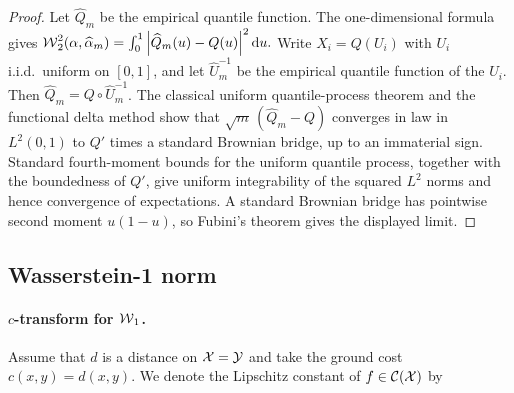 \begin{proof}
Let $\widehat Q_m$ be the empirical quantile function. The one-dimensional formula gives \(\operatorname{\mathcal{W}}_2^2(\alpha,\widehat{\alpha}_m) = \int_0^1\left\lvert\widehat Q_m(u)-Q(u)\right\rvert^2\mathrm{d} u.\)
Write $X_i=Q(U_i)$ with $U_i$ i.i.d.\ uniform on $[0,1]$, and let $\widehat U_m^{-1}$ be the empirical quantile function of the $U_i$. Then $\widehat Q_m=Q\circ \widehat U_m^{-1}$. The classical uniform quantile-process theorem and the functional delta method show that $\sqrt m\,(\widehat Q_m-Q)$ converges in law in $L^2(0,1)$ to $Q'$ times a standard Brownian bridge, up to an immaterial sign. Standard fourth-moment bounds for the uniform quantile process, together with the boundedness of $Q'$, give uniform integrability of the squared $L^2$ norms and hence convergence of expectations. A standard Brownian bridge has pointwise second moment $u(1-u)$, so Fubini's theorem gives the displayed limit.
\end{proof}
\subsection{Wasserstein-1 norm}
\label{sec-W1}
\paragraph{\texorpdfstring{$c$-transform for $\operatorname{\mathcal{W}}_1$.}{c-transform for W1.}}
Assume that $d$ is a distance on $\mathcal{X}=\mathcal{Y}$ and take the ground cost $c(x,y)=d(x,y)$. We denote the Lipschitz constant of $f\in\mathcal{C}(\mathcal{X})$ by

